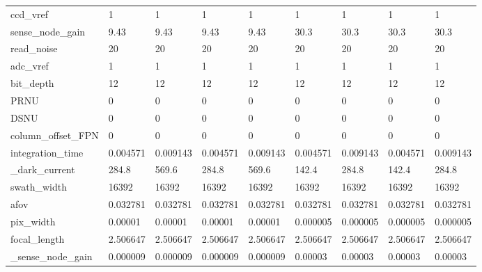 \begin{tabular}{lllllllll}
ccd\_vref               &         1 &         1 &         1 &         1 &         1 &         1 &         1 &         1 \\
sense\_node\_gain        &      9.43 &      9.43 &      9.43 &      9.43 &      30.3 &      30.3 &      30.3 &      30.3 \\
read\_noise             &        20 &        20 &        20 &        20 &        20 &        20 &        20 &        20 \\
adc\_vref               &         1 &         1 &         1 &         1 &         1 &         1 &         1 &         1 \\
bit\_depth              &        12 &        12 &        12 &        12 &        12 &        12 &        12 &        12 \\
PRNU                   &         0 &         0 &         0 &         0 &         0 &         0 &         0 &         0 \\
DSNU                   &         0 &         0 &         0 &         0 &         0 &         0 &         0 &         0 \\
column\_offset\_FPN      &         0 &         0 &         0 &         0 &         0 &         0 &         0 &         0 \\
integration\_time       &  0.004571 &  0.009143 &  0.004571 &  0.009143 &  0.004571 &  0.009143 &  0.004571 &  0.009143 \\
\_dark\_current          &     284.8 &     569.6 &     284.8 &     569.6 &     142.4 &     284.8 &     142.4 &     284.8 \\
swath\_width            &     16392 &     16392 &     16392 &     16392 &     16392 &     16392 &     16392 &     16392 \\
afov                   &  0.032781 &  0.032781 &  0.032781 &  0.032781 &  0.032781 &  0.032781 &  0.032781 &  0.032781 \\
pix\_width              &   0.00001 &   0.00001 &   0.00001 &   0.00001 &  0.000005 &  0.000005 &  0.000005 &  0.000005 \\
focal\_length           &  2.506647 &  2.506647 &  2.506647 &  2.506647 &  2.506647 &  2.506647 &  2.506647 &  2.506647 \\
\_sense\_node\_gain       &  0.000009 &  0.000009 &  0.000009 &  0.000009 &   0.00003 &   0.00003 &   0.00003 &   0.00003 \\
\bottomrule
\end{tabular}
